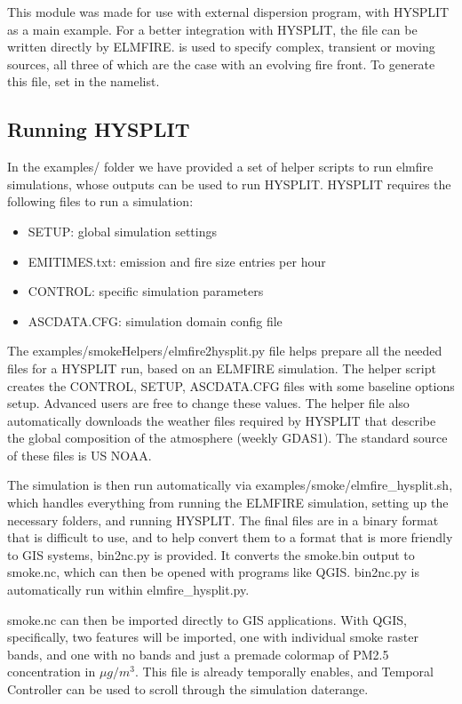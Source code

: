 This module was made for use with external dispersion program, with HYSPLIT as a main example. For a better integration with HYSPLIT, the  file can be written directly by ELMFIRE.  is used to specify complex, transient or moving sources, all three of which are the case with an evolving fire front. To generate this file, set  in the  namelist.

\subsection{Running HYSPLIT}

In the examples/ folder we have provided a set of helper scripts to run elmfire simulations, whose outputs can be used to run HYSPLIT. HYSPLIT requires the following files to run a simulation:

\begin{itemize}
    \item SETUP: global simulation settings
    \item EMITIMES.txt: emission and fire size entries per hour
    \item CONTROL: specific simulation parameters
    \item ASCDATA.CFG: simulation domain config file 
\end{itemize}

The examples/smokeHelpers/elmfire2hysplit.py file helps prepare all the needed files for a HYSPLIT run, based on an ELMFIRE simulation. The helper script creates the CONTROL, SETUP, ASCDATA.CFG files with some baseline options setup. Advanced users are free to change these values. The helper file also automatically downloads the weather files required by HYSPLIT that describe the global composition of the atmosphere (weekly GDAS1). The standard source of these files is US NOAA. 

The simulation is then run automatically via examples/smoke/elmfire\_hysplit.sh, which handles everything from running the ELMFIRE simulation, setting up the necessary folders, and running HYSPLIT. The final files are in a binary format that is difficult to use, and to help convert them to a format that is more friendly to GIS systems, bin2nc.py is provided. It converts the smoke.bin output to smoke.nc, which can then be opened with programs like QGIS. bin2nc.py is automatically run within elmfire\_hysplit.py. 

smoke.nc can then be imported directly to GIS applications. With QGIS, specifically, two features will be imported, one with individual smoke raster bands, and one with no bands and just a premade colormap of PM2.5 concentration in $\mu g/m^3$. This file is already temporally enables, and Temporal Controller can be used to scroll through the simulation daterange. 


